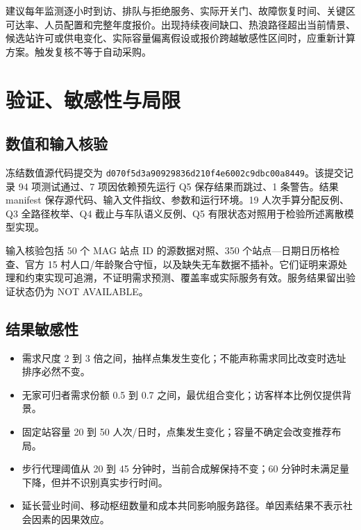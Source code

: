 \documentclass[12pt]{article}
\begin{document}
建议每年监测逐小时到访、排队与拒绝服务、实际开关门、故障恢复时间、关键区可达率、人员配置和完整年度报价。出现持续夜间缺口、热浪路径超出当前情景、候选站许可或供电变化、实际容量偏离假设或报价跨越敏感性区间时，应重新计算方案。触发复核不等于自动采购。

\section{验证、敏感性与局限}

\subsection{数值和输入核验}
冻结数值源代码提交为 \texttt{d070f5d3a90929836d210f4e6002c9dbc00a8449}。该提交记录 94 项测试通过、7 项因依赖预先运行 Q5 保存结果而跳过、1 条警告。结果 manifest 保存源代码、输入文件指纹、参数和运行环境。19 人次手算分配反例、Q3 全路径枚举、Q4 截止与车队语义反例、Q5 有限状态对照用于检验所述离散模型实现。

输入核验包括 50 个 MAG 站点 ID 的源数据对照、350 个站点—日期日历格检查、官方 15 村人口/年龄聚合守恒，以及缺失无车数据不插补。它们证明来源处理和约束实现可追溯，不证明需求预测、覆盖率或实际服务有效。服务结果留出验证状态仍为 NOT AVAILABLE。

\subsection{结果敏感性}
\begin{itemize}
    \item 需求尺度 2 到 3 倍之间，抽样点集发生变化；不能声称需求同比改变时选址排序必然不变。
    \item 无家可归者需求份额 0.5 到 0.7 之间，最优组合变化；访客样本比例仅提供背景。
    \item 固定站容量 20 到 50 人次/日时，点集发生变化；容量不确定会改变推荐布局。
    \item 步行代理阈值从 20 到 45 分钟时，当前合成解保持不变；60 分钟时未满足量下降，但并不识别真实步行时间。
    \item 延长营业时间、移动枢纽数量和成本共同影响服务路径。单因素结果不表示社会因素的因果效应。
\end{itemize}
\end{document}
